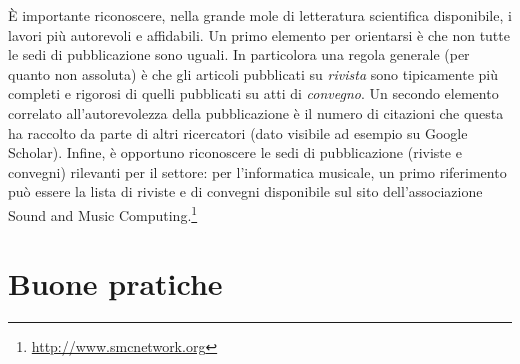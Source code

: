 \documentclass[12pt]{report}
\begin{document}
\`E importante riconoscere, nella grande mole di letteratura scientifica disponibile, i lavori pi\`u autorevoli e affidabili. Un primo elemento per orientarsi \`e che non tutte le sedi di pubblicazione sono uguali. In particolora una regola generale (per quanto non assoluta) \`e che gli articoli pubblicati su {\em rivista} sono tipicamente pi\`u completi e rigorosi di quelli pubblicati su atti di {\em convegno}. Un secondo elemento correlato all'autorevolezza della pubblicazione \`e il numero di citazioni che questa ha raccolto da parte di altri ricercatori (dato visibile ad esempio su Google Scholar). Infine, \`e opportuno riconoscere le sedi di pubblicazione (riviste e convegni) rilevanti per il settore: per l'informatica musicale, un primo riferimento pu\`o essere la lista di riviste e di convegni disponibile sul sito dell'associazione Sound and Music Computing.\footnote{\url{http://www.smcnetwork.org}}

\section{Buone pratiche}
\end{document}
